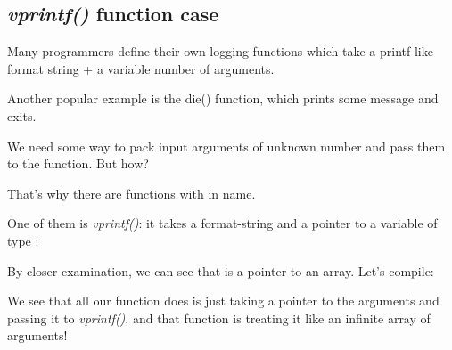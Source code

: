 \subsection{\emph{vprintf()} function case}

Many programmers define their own logging functions which take a printf-like format string + 
a variable number of arguments.

Another popular example is the die() function, which prints some message and exits.

We need some way to pack input arguments of unknown number and pass them to the \printf function.
But how?

That's why there are functions with  in name.

One of them is \emph{vprintf()}: it takes a format-string and a pointer to a variable of type :



By closer examination, we can see that  is a pointer to an array.
Let's compile:



We see that all our function does is just taking a pointer to the arguments and
passing it to \emph{vprintf()}, and that function is treating it like an infinite array of arguments!


